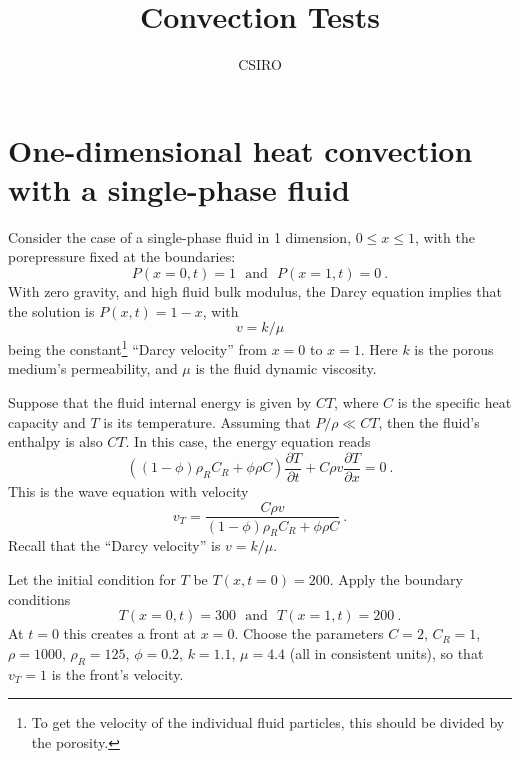 \documentclass[]{scrreprt}
\begin{document}
\title{Convection Tests}
\author{CSIRO}
\maketitle

\tableofcontents

\chapter{One-dimensional heat convection with a single-phase fluid}

Consider the case of a single-phase fluid in 1 dimension, $0\leq x
\leq 1$, with the porepressure fixed at the boundaries:
\begin{equation}
P(x=0, t) = 1 \ \ \ \mbox{and}\ \ \ P(x=1, t) = 0 \ .
\end{equation}
With zero gravity, and high fluid bulk modulus, the Darcy equation
implies that the solution is $P(x, t) = 1 - x$, with
\begin{equation}
v = k/\mu
\end{equation}
being the constant\footnote{To get the velocity of the individual
  fluid particles, this should be divided by the porosity.} ``Darcy
velocity'' from $x=0$ to $x=1$.  Here $k$ is the porous medium's
permeability, and $\mu$ is the fluid dynamic viscosity.

Suppose that the fluid internal energy is given by $CT$, where $C$ is
the specific heat capacity and $T$ is its temperature.  Assuming that
$P/\rho \ll CT$, then the fluid's enthalpy is also $CT$.  In this
case, the energy equation reads
\begin{equation}
\left((1 - \phi)\rho_{R}C_{R} + \phi\rho C \right) \frac{\partial
  T}{\partial t} + C \rho v \frac{\partial T}{\partial x} = 0 \ .
\end{equation}
This is the wave equation with velocity
\begin{equation}
v_{T} = \frac{C\rho v}{(1 - \phi)\rho_{R}C_{R} + \phi\rho C} \ .
\end{equation}
Recall that the ``Darcy velocity'' is $v=k/\mu$.

Let the initial condition for $T$ be $T(x, t=0) = 200$.  Apply the
boundary conditions
\begin{equation}
T(x=0, t) = 300 \ \ \ \mbox{and} \ \ \ T(x=1, t) = 200 \ .
\end{equation}
At $t=0$ this creates a front at $x=0$.  Choose the parameters $C=2$,
$C_{R}=1$, $\rho=1000$, $\rho_{R}=125$, $\phi=0.2$, $k=1.1$, $\mu=4.4$
(all in consistent units), so that $v_{T}=1$ is the front's velocity.
\end{document}
